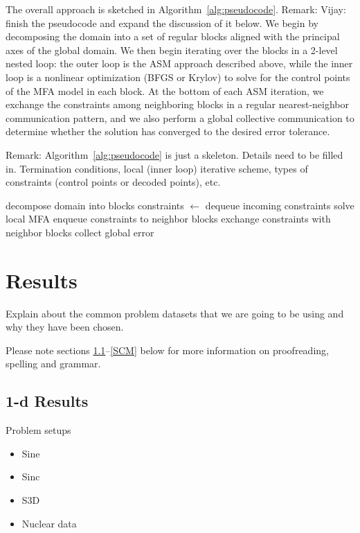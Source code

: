 \documentclass[conference]{IEEEtran}
\newcommand{\Remark}[1]{{\color{RED}\sf Remark: {#1}}}
\begin{document}
The overall approach is sketched in Algorithm~\ref{alg:pseudocode}. \Remark{Vijay: finish the pseudocode and expand the
discussion of it below.} We begin by decomposing the domain into a set of regular blocks aligned with the principal axes
of the global domain. We then begin iterating over the blocks in a 2-level nested loop: the outer loop is the ASM
approach described above, while the inner loop is a nonlinear optimization (BFGS or Krylov) to solve for the control
points of the MFA model in each block. At the bottom of each ASM iteration, we exchange the constraints
among neighboring blocks in a regular nearest-neighbor communication pattern, and we also perform a global
collective communication to determine whether the solution has converged to the desired error tolerance.

\Remark{Algorithm~\ref{alg:pseudocode} is just a skeleton. Details need to be filled in. Termination conditions, local
(inner loop) iterative scheme, types of constraints (control points or decoded points), etc.}

\begin{algorithm}
    \DontPrintSemicolon
    decompose domain into blocks\;
    \;
    {
        constraints $\leftarrow$ dequeue incoming constraints\;
        \;
        {
            solve local MFA\;
            enqueue constraints to neighbor blocks\;
        }
        exchange constraints with neighbor blocks\;
        collect global error\;
    }
    \caption{\Remark{Caption TBD}}
    \label{alg:pseudocode}
\end{algorithm}


\section{Results}

Explain about the common problem datasets that we are going to be using and why they have been chosen.

Please note sections \ref{AA}--\ref{SCM} below for more information on 
proofreading, spelling and grammar.

\subsection{1-d Results}\label{AA}

Problem setups
\begin{itemize}
  \item Sine
  \item Sinc
  \item S3D
  \item Nuclear data
\end{itemize}
\end{document}
